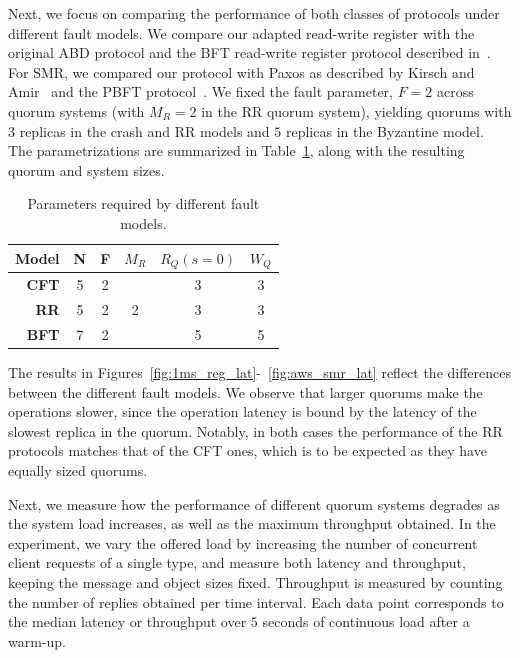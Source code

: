 Next, we focus on comparing the performance of both classes of protocols under different
fault models.
%
We compare our adapted read-write register with the original ABD
protocol and the \ac{BFT} read-write register protocol described
in~\cite{Malkhi:Reiter:BQS:98}. For SMR, we compared our protocol with
Paxos as described by Kirsch and Amir~\cite{paxos_builders} and the
PBFT protocol~\cite{pbft}. We fixed the fault parameter, $F= 2$ across
quorum systems (with $M_R=2$ in the \ac{RR} quorum system),
yielding quorums with $3$ replicas in the crash and
\ac{RR} models and $5$ replicas in the Byzantine model. The
parametrizations are summarized in
Table~\ref{table:quorum_sizes}, along with the resulting quorum
and system sizes.

\begin{table}[b]
    \centering
    \begin{tabular}{|r || c | c | c || c | c |}
        \hline
        \textbf{Model}       & N & F & $M_R$ & $R_Q(s = 0)$ & $W_Q$\\ \hline
        \textbf{\ac{CFT}}         & 5 & 2 &   &   3   &   3  \\
        \textbf{\ac{RR}} & 5 & 2 & 2 &   3   &   3  \\
        \textbf{\ac{BFT}}         & 7 & 2 &   &   5   &   5  \\ \hline
    \end{tabular}
    \caption{Parameters required by different fault models.}\label{table:quorum_sizes}
\end{table}

The results in Figures~\ref{fig:1ms_reg_lat}-~\ref{fig:aws_smr_lat}
reflect the differences between the different fault models.  We
observe that larger quorums make the operations slower, since the
operation latency is bound by the latency of the slowest replica in
the quorum. Notably, in both cases the performance of the
\ac{RR} protocols matches that of the \ac{CFT} ones, which is to be
expected as they have equally sized quorums.

Next, we measure how the performance of different quorum systems
degrades as the system load increases, as well as the maximum
throughput obtained. In the experiment, we vary the offered load by
increasing the number of concurrent client requests of a single type,
and measure both latency and throughput, keeping the message and
object sizes fixed. Throughput is measured by
counting the number of replies obtained per time interval.  Each
data point corresponds to the median latency or throughput over $5$
seconds of continuous load after a warm-up.
%

